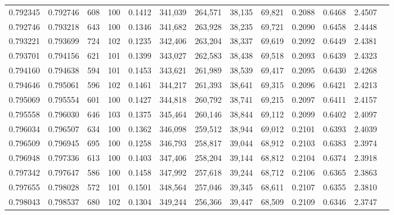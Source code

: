 \begin{tabular}{rrrrrrrrrrrrr}
0.792345 & 0.792746 &   608 & 100 &                                     0.1412 & 341,039 & 264,571 &  38,135 &  69,821 & 0.2088 & 0.6468 & 2.4507 \\
0.792746 & 0.793218 &   643 & 100 &                                     0.1346 & 341,682 & 263,928 &  38,235 &  69,721 & 0.2090 & 0.6458 & 2.4448 \\
0.793221 & 0.793699 &   724 & 102 &                                     0.1235 & 342,406 & 263,204 &  38,337 &  69,619 & 0.2092 & 0.6449 & 2.4381 \\
0.793701 & 0.794156 &   621 & 101 &                                     0.1399 & 343,027 & 262,583 &  38,438 &  69,518 & 0.2093 & 0.6439 & 2.4323 \\
0.794160 & 0.794638 &   594 & 101 &                                     0.1453 & 343,621 & 261,989 &  38,539 &  69,417 & 0.2095 & 0.6430 & 2.4268 \\
0.794646 & 0.795061 &   596 & 102 &                                     0.1461 & 344,217 & 261,393 &  38,641 &  69,315 & 0.2096 & 0.6421 & 2.4213 \\
0.795069 & 0.795554 &   601 & 100 &                                     0.1427 & 344,818 & 260,792 &  38,741 &  69,215 & 0.2097 & 0.6411 & 2.4157 \\
0.795558 & 0.796030 &   646 & 103 &                                     0.1375 & 345,464 & 260,146 &  38,844 &  69,112 & 0.2099 & 0.6402 & 2.4097 \\
0.796034 & 0.796507 &   634 & 100 &                                     0.1362 & 346,098 & 259,512 &  38,944 &  69,012 & 0.2101 & 0.6393 & 2.4039 \\
0.796509 & 0.796945 &   695 & 100 &                                     0.1258 & 346,793 & 258,817 &  39,044 &  68,912 & 0.2103 & 0.6383 & 2.3974 \\
0.796948 & 0.797336 &   613 & 100 &                                     0.1403 & 347,406 & 258,204 &  39,144 &  68,812 & 0.2104 & 0.6374 & 2.3918 \\
0.797342 & 0.797647 &   586 & 100 &                                     0.1458 & 347,992 & 257,618 &  39,244 &  68,712 & 0.2106 & 0.6365 & 2.3863 \\
0.797655 & 0.798028 &   572 & 101 &                                     0.1501 & 348,564 & 257,046 &  39,345 &  68,611 & 0.2107 & 0.6355 & 2.3810 \\
0.798043 & 0.798537 &   680 & 102 &                                     0.1304 & 349,244 & 256,366 &  39,447 &  68,509 & 0.2109 & 0.6346 & 2.3747 \\

\end{tabular}
